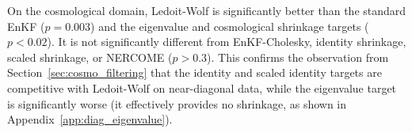 On the cosmological domain, Ledoit-Wolf is significantly better than the standard EnKF ($p = 0.003$) and the eigenvalue and cosmological shrinkage targets ($p < 0.02$). It is not significantly different from EnKF-Cholesky, identity shrinkage, scaled shrinkage, or NERCOME ($p > 0.3$). This confirms the observation from Section~\ref{sec:cosmo_filtering} that the identity and scaled identity targets are competitive with Ledoit-Wolf on near-diagonal data, while the eigenvalue target is significantly worse (it effectively provides no shrinkage, as shown in Appendix~\ref{app:diag_eigenvalue}).
